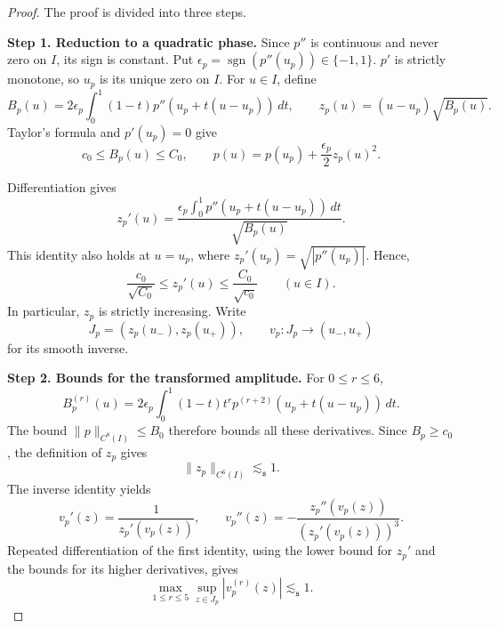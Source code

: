 \documentclass[reqno,12pt]{amsart}
\def \R {\mathbb R}
\numberwithin{equation}{section}
\begin{document}
\begin{proof}
The proof is divided into three steps.

	\medskip
	\noindent\textbf{Step 1. Reduction to a quadratic phase.}
	Since $p''$ is continuous and never zero on $I$, its sign is
	constant. Put
	$
	\epsilon_p=\operatorname{sgn}(p''(u_p))\in\{-1,1\}.
$
	$p'$ is strictly monotone, so $u_p$ is its unique
	zero on $I$. For $u\in I$, define
	\[
	B_p(u)=2\epsilon_p\int_0^1(1-t)
	p''(u_p+t(u-u_p))\,dt,
	\qquad
	z_p(u)=(u-u_p)\sqrt{B_p(u)}.
	\]
	Taylor's formula and $p'(u_p)=0$ give
	\[
	c_0\le B_p(u)\le C_0,
	\qquad
	p(u)=p(u_p)+\frac{\epsilon_p}{2}z_p(u)^2.
	\]
	
	Differentiation gives
	\[
	z_p'(u)=
	\frac{\epsilon_p\displaystyle\int_0^1
		p''(u_p+t(u-u_p))\,dt}
	{\sqrt{B_p(u)}}.
	\]
	This identity also holds at $u=u_p$, where
	$z_p'(u_p)=\sqrt{|p''(u_p)|}$. Hence,
	\[
	\frac{c_0}{\sqrt{C_0}}
	\le z_p'(u)\le
	\frac{C_0}{\sqrt{c_0}}
	\qquad(u\in I).
	\]
	In particular, $z_p$ is strictly increasing. Write
	\[
	J_p=(z_p(u_-),z_p(u_+)),
	\qquad
	v_p:J_p\longrightarrow(u_-,u_+)
	\]
	for its smooth inverse.
	
	\medskip
	\noindent\textbf{Step 2. Bounds for the transformed amplitude.}
	For $0\le r\le6$,
	\[
	B_p^{(r)}(u)
	=2\epsilon_p\int_0^1(1-t)t^r
	p^{(r+2)}(u_p+t(u-u_p))\,dt.
	\]
	The bound $\|p\|_{C^8(I)}\le B_0$ therefore bounds all these
	derivatives. Since $B_p\ge c_0$, the definition of $z_p$ gives
	\[
	\|z_p\|_{C^6(I)}\lesssim_{\mathfrak s} 1.
	\]
	The inverse identity yields
	\[
	v_p'(z)=\frac1{z_p'(v_p(z))},
	\qquad
	v_p''(z)=-
	\frac{z_p''(v_p(z))}{(z_p'(v_p(z)))^3}.
	\]
	Repeated differentiation of the first identity, using the lower
	bound for $z_p'$ and the bounds for its higher derivatives, gives
	\[
	\max_{1\le r\le5}\sup_{z\in J_p}|v_p^{(r)}(z)|
	\lesssim_{\mathfrak s} 1.
	\]
	

\end{proof}
\end{document}
